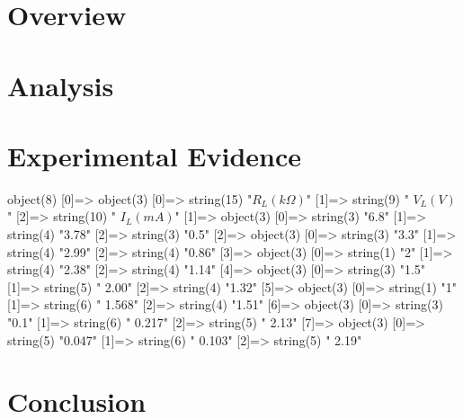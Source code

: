 \documentclass{article}
\begin{document}
      
   \section{Overview}
   \label{sec:Overview}
   
   \section{Analysis}
   \label{sec:Analysis}
   
   \section{Experimental Evidence}
   \label{sec:Experimental Evidence}
   


object(8) {
  [0]=> 
    object(3) {
    [0]=> 
    string(15) "$R_L(k \Omega)$"
    [1]=> 
    string(9) " $V_L(V)$"
    [2]=> 
    string(10) " $I_L(mA)$"
  }
  [1]=> 
    object(3) {
    [0]=> 
    string(3) "6.8"
    [1]=> 
    string(4) "3.78"
    [2]=> 
    string(3) "0.5"
  }
  [2]=> 
    object(3) {
    [0]=> 
    string(3) "3.3"
    [1]=> 
    string(4) "2.99"
    [2]=> 
    string(4) "0.86"
  }
  [3]=> 
    object(3) {
    [0]=> 
    string(1) "2"
    [1]=> 
    string(4) "2.38"
    [2]=> 
    string(4) "1.14"
  }
  [4]=> 
    object(3) {
    [0]=> 
    string(3) "1.5"
    [1]=> 
    string(5) " 2.00"
    [2]=> 
    string(4) "1.32"
  }
  [5]=> 
    object(3) {
    [0]=> 
    string(1) "1"
    [1]=> 
    string(6) " 1.568"
    [2]=> 
    string(4) "1.51"
  }
  [6]=> 
    object(3) {
    [0]=> 
    string(3) "0.1"
    [1]=> 
    string(6) " 0.217"
    [2]=> 
    string(5) " 2.13"
  }
  [7]=> 
    object(3) {
    [0]=> 
    string(5) "0.047"
    [1]=> 
    string(6) " 0.103"
    [2]=> 
    string(5) " 2.19"
  }
}


   \section{Conclusion}
   \label{sec:Conclusion}
   
\end{document}
